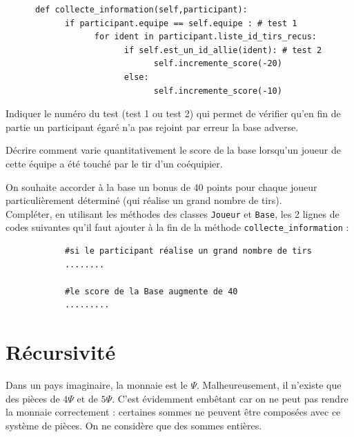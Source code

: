 \documentclass[a4paper,12pt,eval,firamath]{nsi}
\begin{document}
\begin{pyc}
      \begin{verbatim}
      def collecte_information(self,participant):
            if participant.equipe == self.equipe : # test 1
                  for ident in participant.liste_id_tirs_recus:
                        if self.est_un_id_allie(ident): # test 2
                              self.incremente_score(-20)
                        else:
                              self.incremente_score(-10)
\end{verbatim}
\end{pyc}
\begin{enumalph}
      \item Indiquer le numéro du test (test 1 ou test 2) qui permet de vérifier qu'en fin de
      partie un participant égaré n'a pas rejoint par erreur la base adverse.\\
      
      
      \item Décrire comment varie quantitativement le score de la base lorsqu'un joueur
      de cette équipe a été touché par le tir d'un coéquipier.
      
\end{enumalph}

On souhaite accorder à la base un bonus de 40 points pour chaque joueur particulièrement déterminé (qui réalise un grand nombre de tirs).\\

\question Compléter, en utilisant les méthodes des classes \texttt{Joueur} et \texttt{Base}, les 2 lignes de codes suivantes qu'il faut ajouter à la fin de la méthode \texttt{collecte_information} :
\begin{pyc}
      \begin{verbatim}
            #si le participant réalise un grand nombre de tirs
            ........ 

            #le score de la Base augmente de 40
            .........             
      \end{verbatim}
\end{pyc}


\section{Récursivité}
\resetquestion

Dans un pays imaginaire, la monnaie est le $\Psi $. Malheureusement, il n'existe que des pièces de $4\Psi $ et de $5\Psi $. C'est évidemment embêtant car on ne peut pas rendre la monnaie correctement : certaines sommes ne peuvent être composées avec ce système de pièces. On ne considère que des sommes entières.\\
\end{document}
